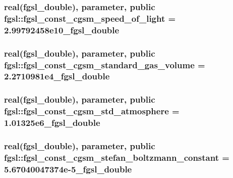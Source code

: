 \subsubsection[{fgsl\+\_\+const\+\_\+cgsm\+\_\+speed\+\_\+of\+\_\+light}]{\setlength{\rightskip}{0pt plus 5cm}real({\bf fgsl\+\_\+double}), parameter, public fgsl\+::fgsl\+\_\+const\+\_\+cgsm\+\_\+speed\+\_\+of\+\_\+light = 2.\+99792458e10\+\_\+fgsl\+\_\+double}\label{namespacefgsl_a5b4812e235747b48af51d2e576dfa469}
\hypertarget{namespacefgsl_ab7cd57aadb050c6aa836b7ab1246f435}{}
\subsubsection[{fgsl\+\_\+const\+\_\+cgsm\+\_\+standard\+\_\+gas\+\_\+volume}]{\setlength{\rightskip}{0pt plus 5cm}real({\bf fgsl\+\_\+double}), parameter, public fgsl\+::fgsl\+\_\+const\+\_\+cgsm\+\_\+standard\+\_\+gas\+\_\+volume = 2.\+2710981e4\+\_\+fgsl\+\_\+double}\label{namespacefgsl_ab7cd57aadb050c6aa836b7ab1246f435}
\hypertarget{namespacefgsl_a3da30a3dd34b8f19a5e653e57f41f360}{}
\subsubsection[{fgsl\+\_\+const\+\_\+cgsm\+\_\+std\+\_\+atmosphere}]{\setlength{\rightskip}{0pt plus 5cm}real({\bf fgsl\+\_\+double}), parameter, public fgsl\+::fgsl\+\_\+const\+\_\+cgsm\+\_\+std\+\_\+atmosphere = 1.\+01325e6\+\_\+fgsl\+\_\+double}\label{namespacefgsl_a3da30a3dd34b8f19a5e653e57f41f360}
\hypertarget{namespacefgsl_a7b2b26a4a33ccd17f26be17db533b3ac}{}
\subsubsection[{fgsl\+\_\+const\+\_\+cgsm\+\_\+stefan\+\_\+boltzmann\+\_\+constant}]{\setlength{\rightskip}{0pt plus 5cm}real({\bf fgsl\+\_\+double}), parameter, public fgsl\+::fgsl\+\_\+const\+\_\+cgsm\+\_\+stefan\+\_\+boltzmann\+\_\+constant = 5.\+67040047374e-\/5\+\_\+fgsl\+\_\+double}\label{namespacefgsl_a7b2b26a4a33ccd17f26be17db533b3ac}
\hypertarget{namespacefgsl_a8f6eb902874b66bc00a4959e7444cb1a}{}
